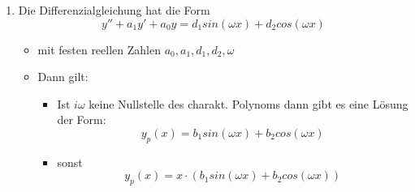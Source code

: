 \documentclass[german]{latex4ei/latex4ei_sheet}
\begin{document}
\begin{sectionbox}
\begin{enumerate}
    \item Die Differenzialgleichung hat die Form 
    $$ y'' + a_1 y' + a_0y = d_1 sin(\omega x) + d_2cos(\omega x) $$ 
    \begin{itemize}
        \item mit festen reellen Zahlen $a_0, a_1, d_1, d_2, \omega$
        \item Dann gilt: 
        \begin{itemize}
            \item Ist $i\omega$ keine Nullstelle des charakt. Polynoms dann gibt es eine Lösung der Form: 
            $$ y_p(x) = b_1 sin(\omega x) + b_2 cos(\omega x)$$
            \item sonst
            $$ y_p(x) = x\cdot (b_1 sin(\omega x) + b_2 cos(\omega x))$$
            
        \end{itemize}
    \end{itemize}
\end{enumerate}

\end{sectionbox}

\columnbreak %
\end{document}
